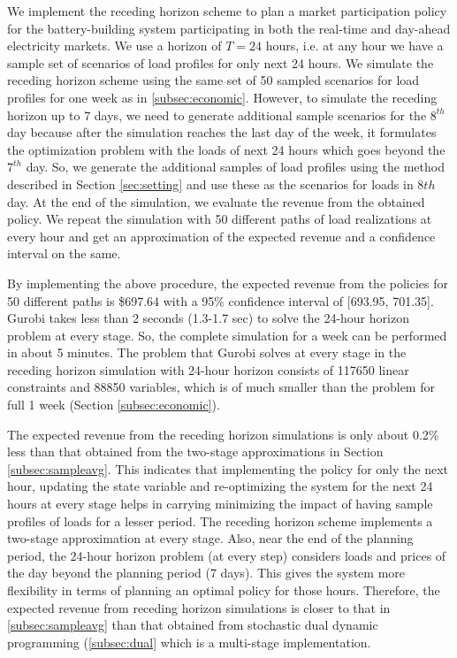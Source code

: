 \documentclass[11pt,twoside]{article}
\begin{document}
We implement the receding horizon scheme to plan a market participation policy for the battery-building system participating in both the real-time and day-ahead electricity markets. We use a horizon of $T=24$ hours, i.e. at any hour we have a sample set of scenarios of load profiles for only next 24 hours. We simulate the receding horizon scheme using the same set of 50 sampled scenarios for load profiles for one week as in \ref{subsec:economic}. However, to simulate the receding horizon up to 7 days, we need to generate additional sample scenarios for the $8^{th}$ day because after the simulation reaches the last day of the week, it formulates the optimization problem with the loads of next 24 hours which goes beyond the $7^{th}$ day. So, we generate the additional samples of load profiles using the method described in Section \ref{sec:setting} and use these as the scenarios for loads in $8{th}$ day. At the end of the simulation, we evaluate the revenue from the obtained policy. We repeat the simulation with 50 different paths of load realizations at every hour and get an approximation of the expected revenue and a confidence interval on the same.

By implementing the above procedure, the expected revenue from the policies for 50 different paths is \$697.64 with a 95\% confidence interval of [693.95, 701.35]. 
Gurobi takes less than 2 seconds (1.3-1.7 sec) to solve the 24-hour horizon problem at every stage. So, the complete simulation for a week can be performed in about 5 minutes. The problem that Gurobi solves at every stage in the receding horizon simulation with 24-hour horizon consists of 117650 linear constraints and 88850 variables, which is of much smaller than the problem for full 1 week (Section \ref{subsec:economic}).

The expected revenue from the receding horizon simulations is only about 0.2\% less than that obtained from the two-stage approximations in Section \ref{subsec:sampleavg}. This indicates that implementing the policy for only the next hour, updating the state variable and re-optimizing the system for the next 24 hours at every stage helps in carrying minimizing the impact of having sample profiles of loads for a lesser period. The receding horizon scheme implements a two-stage approximation at every stage. Also, near the end of the planning period, the 24-hour horizon problem (at every step) considers loads and prices of the day beyond the planning period (7 days). This gives the system more flexibility in terms of planning an optimal policy for those hours. Therefore, the expected revenue from receding horizon simulations is closer to that in \ref{subsec:sampleavg} than that obtained from stochastic dual dynamic programming (\ref{subsec:dual} which is a multi-stage implementation.
\end{document}
